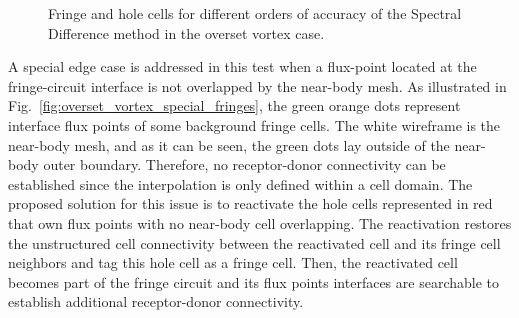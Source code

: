 \begin{figure}[H]
{		\label{fig:overset_vortex_p3_fringes_bdy}
    }
    \caption{Fringe and hole cells for different orders of accuracy of the Spectral Difference method in the overset vortex case.}
    \label{fig:overset_vortex_fringes}
\end{figure}

A special edge case is addressed in this test when a flux-point located at the fringe-circuit interface is not overlapped by the near-body mesh. As illustrated in Fig.\ \ref{fig:overset_vortex_special_fringes}, the green orange dots represent interface flux points of some background fringe cells. The white wireframe is the near-body mesh, and  as it can be seen, the green dots lay outside of the near-body outer boundary. Therefore, no receptor-donor connectivity can be established since the interpolation is only defined within a cell domain. The proposed solution for this issue is to reactivate the hole cells represented in red that own flux points with no near-body cell overlapping. The reactivation restores the unstructured cell connectivity between the reactivated cell and its fringe cell neighbors and tag this hole cell as a fringe cell. Then, the reactivated cell becomes part of the fringe circuit and its flux points interfaces are searchable to establish additional receptor-donor connectivity.

